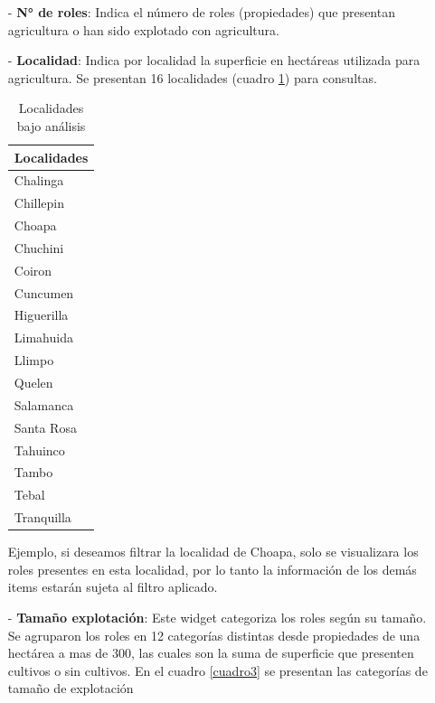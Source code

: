 \documentclass[10pt]{article}
\begin{document}
 \begin{itemize}
 \item[-]\textbf{N° de roles}: Indica el número de roles (propiedades) que presentan agricultura o han sido explotado con agricultura.
 \item[-]\textbf{Localidad}: Indica por localidad la superficie en hectáreas utilizada para agricultura. Se presentan 16 localidades (cuadro \ref{cuadro 2}) para consultas. 

\begin{table}[H]
\centering
\caption{Localidades bajo análisis}
\label{cuadro 2}
\begin{tabular}{@{}l@{}}
\toprule
\textbf{Localidades} \\ \midrule
Chalinga             \\
Chillepin            \\
Choapa               \\
Chuchini             \\
Coiron               \\
Cuncumen             \\
Higuerilla           \\
Limahuida            \\
Llimpo               \\
Quelen               \\
Salamanca            \\
Santa Rosa           \\
Tahuinco             \\
Tambo                \\
Tebal                \\
Tranquilla           \\ \bottomrule
\end{tabular}
\end{table}
 
 Ejemplo, si deseamos filtrar la localidad de Choapa, solo se visualizara los roles presentes en esta localidad, por lo tanto la información de los demás items estarán sujeta al filtro aplicado.
 
 
 
 \item[-]\textbf{Tamaño explotación}: Este widget categoriza los roles según su tamaño. Se agruparon los roles en 12 categorías distintas desde propiedades de una hectárea a mas de 300, las cuales son la suma de superficie que presenten cultivos o sin cultivos. En el cuadro \ref{cuadro3}  se presentan las categorías de tamaño de explotación
 

\end{itemize}
\end{document}
